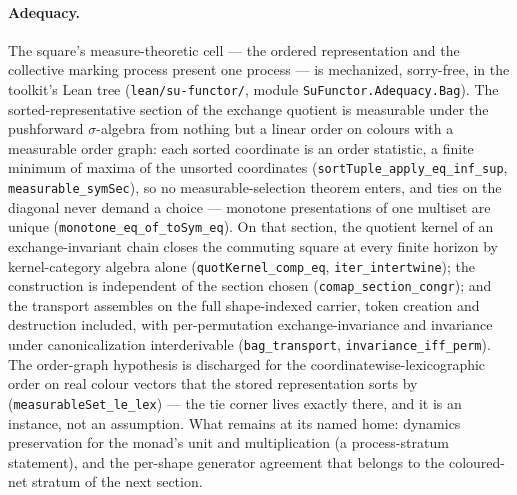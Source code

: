 \paragraph{Adequacy.} The square's measure-theoretic cell --- the
ordered representation and the collective marking process present one
process --- is mechanized, sorry-free, in the toolkit's Lean tree
(\texttt{lean/su-functor/}, module \texttt{SuFunctor.Adequacy.Bag}).
The sorted-representative section of the exchange quotient is
measurable under the pushforward $\sigma$-algebra from nothing but a
linear order on colours with a measurable order graph: each sorted
coordinate is an order statistic, a finite minimum of maxima of the
unsorted coordinates (\texttt{sortTuple\_apply\_eq\_inf\_sup},
\texttt{measurable\_symSec}), so no measurable-selection theorem
enters, and ties on the diagonal never demand a choice --- monotone
presentations of one multiset are unique
(\texttt{monotone\_eq\_of\_toSym\_eq}). On that section, the quotient
kernel of an exchange-invariant chain closes the commuting square at
every finite horizon by kernel-category algebra alone
(\texttt{quotKernel\_comp\_eq}, \texttt{iter\_intertwine}); the
construction is independent of the section chosen
(\texttt{comap\_section\_congr}); and the transport assembles on the
full shape-indexed carrier, token creation and destruction included,
with per-permutation exchange-invariance and invariance under
canonicalization interderivable (\texttt{bag\_transport},
\texttt{invariance\_iff\_perm}). The order-graph hypothesis is
discharged for the coordinatewise-lexicographic order on real colour
vectors that the stored representation sorts by
(\texttt{measurableSet\_le\_lex}) --- the tie corner lives exactly
there, and it is an instance, not an assumption. What remains at its
named home: dynamics preservation for the monad's unit and
multiplication (a process-stratum statement), and the per-shape
generator agreement that belongs to the coloured-net stratum of the
next section.



